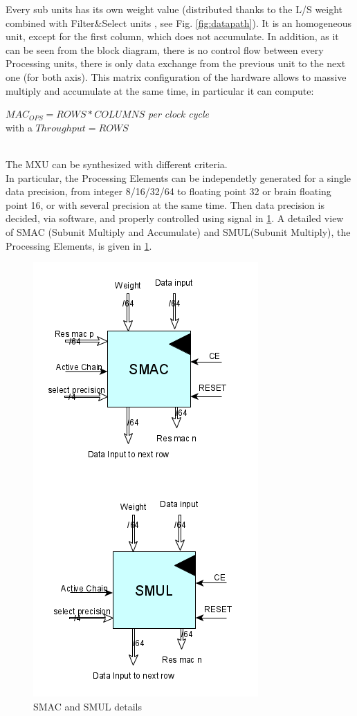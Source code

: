 Every sub units has its own weight value (distributed thanks to the L/S weight combined with Filter\&Select units , see Fig. \ref{fig:datapath}). It is an homogeneous unit, except for the first column, which does not accumulate. In addition, as it can be seen from the block diagram, there is no control flow between every Processing units, there is only data exchange from the previous unit to the next one (for both axis). This matrix configuration of the hardware allows to massive multiply and accumulate at the same time, in particular it can compute:\\
\begin{center}
$MAC_{OPS}= ROWS*COLUMNS $ \textit{per clock cycle}\\  with a $Throughput=ROWS$ 
\end{center}
\ \\
The MXU can be synthesized with different criteria.\\ In particular, the Processing Elements can be independetly generated for a single data precision, from integer 8/16/32/64 to floating point 32 or brain floating point 16, or with several precision at the same time. Then data precision is decided, via software, and properly controlled using signal in \ref{fig:smac}.
\newpage
A detailed view of SMAC (Subunit Multiply and Accumulate) and SMUL(Subunit Multiply), the Processing Elements, is given in \ref{fig:smac}.
\begin{figure}[H]
\centering
\captionsetup{justification=centering}
\includegraphics[scale=0.45,angle=0]{./figure/smac.png}
\caption{SMAC and SMUL details }
\label{fig:smac}
\end{figure} 

